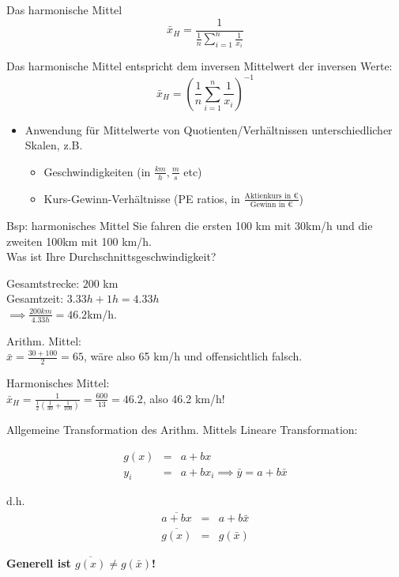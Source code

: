 \documentclass[
  10pt,
  ignorenonframetext,
]{beamer}
\providecommand{\tightlist}{%
  \setlength{\itemsep}{0pt}\setlength{\parskip}{0pt}}
\begin{document}
\begin{frame}{Das harmonische Mittel}
\protect\hypertarget{das-harmonische-mittel}{}
\begin{displaymath}
    \bar x_H = \frac{1}{\frac{1}{n} \sum_{i=1}^{n} \frac{1}{x_i}}
\end{displaymath}

Das harmonische Mittel entspricht dem inversen Mittelwert der inversen
Werte: \begin{displaymath}
   \bar x_H = \left(\frac{1}{n} \sum_{i=1}^n   \frac{1}{x_i}\right)^{-1}
\end{displaymath}

\begin{itemize}
\tightlist
\item
  Anwendung für Mittelwerte von Quotienten/Verhältnissen
  unterschiedlicher Skalen, z.B.

  \begin{itemize}
  \tightlist
  \item
    Geschwindigkeiten (in \(\tfrac{km}{h}, \tfrac{m}{s}\) etc)
  \item
    Kurs-Gewinn-Verhältnisse (PE ratios, in
    \(\tfrac{\text{Aktienkurs in }€}{\text{Gewinn in }€}\))
  \end{itemize}
\end{itemize}
\end{frame}

\begin{frame}{Bsp: harmonisches Mittel}
\protect\hypertarget{bsp-harmonisches-mittel}{}
Sie fahren die ersten 100 km mit 30km/h und die zweiten 100km mit 100
km/h.\\
Was ist Ihre Durchschnittsgeschwindigkeit?

Gesamtstrecke: \(200\) km\\
Gesamtzeit: \(3.33 h + 1h = 4.33h\)\\
\(\implies \frac{200 km}{4.33 h} = 46.2\)km/h.

Arithm. Mittel:\\
\(\bar x = \frac{30 + 100}{2} = 65\), wäre also 65 km/h und
offensichtlich falsch.

Harmonisches Mittel:\\
\(\bar x_H = \frac{1}{\tfrac{1}{2}\left(\tfrac{1}{30}+ \tfrac{1}{100}\right)} = \tfrac{600}{13} = 46.2\),
also 46.2 km/h!
\end{frame}

\begin{frame}{Allgemeine Transformation des Arithm. Mittels}
\protect\hypertarget{allgemeine-transformation-des-arithm.-mittels}{}
Lineare Transformation:

\begin{eqnarray*}
  g(x) &=& a + bx \\
  y_i &=& a + bx_i \implies \bar y = a + b \bar x
\end{eqnarray*}

d.h. \begin{eqnarray*}
  \overline{a + bx} &=& a + b \bar x \\
  \overline{g(x)} &=& g(\bar x)
\end{eqnarray*}

\textbf{Generell ist \(\overline{g(x)} \neq g(\bar x)\)!}
\end{frame}
\end{document}
